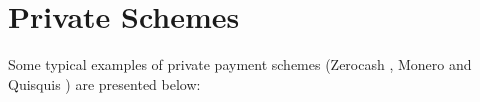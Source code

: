 \section{Private Schemes}
Some typical examples of private payment schemes (Zerocash \cite{Zerocash}, Monero \cite{Monero} and Quisquis \cite{fauzi2019quisquis}) are presented below:
% 



